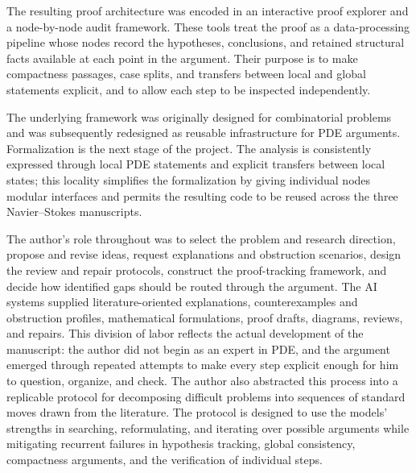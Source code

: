 \documentclass[11pt]{amsart}
\theoremstyle{plain}
\theoremstyle{definition}
\theoremstyle{remark}
\numberwithin{equation}{section}
\begin{document}
The resulting proof architecture was encoded in an interactive proof explorer
and a node-by-node audit framework.  These tools treat the proof as a
data-processing pipeline whose nodes record the hypotheses, conclusions, and
retained structural facts available at each point in the argument.  Their
purpose is to make compactness passages, case splits, and transfers between
local and global statements explicit, and to allow each step to be inspected
independently.

The underlying framework was originally designed for combinatorial problems
and was subsequently redesigned as reusable infrastructure for PDE arguments.
Formalization is the next stage of the project.  The analysis is consistently
expressed through local PDE statements and explicit transfers between local
states; this locality simplifies the formalization by giving individual nodes
modular interfaces and permits the resulting code to be reused across the
three Navier--Stokes manuscripts.

The author's role throughout was to select the problem and research direction,
propose and revise ideas, request explanations and obstruction scenarios,
design the review and repair protocols, construct the proof-tracking framework,
and decide how identified gaps should be routed through the argument.  The AI
systems supplied literature-oriented explanations, counterexamples and
obstruction profiles, mathematical formulations, proof drafts, diagrams,
reviews, and repairs.  This division of labor reflects the actual development
of the manuscript: the author did not begin as an expert in PDE, and the
argument emerged through repeated attempts to make every step explicit enough
for him to question, organize, and check.  The author also abstracted this
process into a replicable protocol for decomposing difficult problems into
sequences of standard moves drawn from the literature.  The protocol is
designed to use the models' strengths in searching, reformulating, and
iterating over possible arguments while mitigating recurrent failures in
hypothesis tracking, global consistency, compactness arguments, and the
verification of individual steps.
\end{document}
